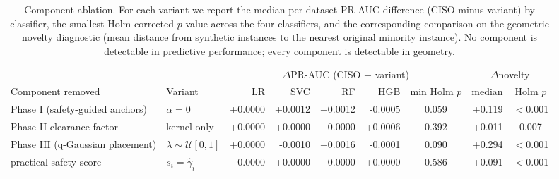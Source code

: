 \begin{table}[t]\centering
\caption{Component ablation. For each variant we report the median per-dataset PR-AUC difference (CISO minus variant) by classifier, the smallest Holm-corrected $p$-value across the four classifiers, and the corresponding comparison on the geometric novelty diagnostic (mean distance from synthetic instances to the nearest original minority instance). No component is detectable in predictive performance; every component is detectable in geometry.}
\label{tab:ablation}\footnotesize\setlength{\tabcolsep}{4pt}
\begin{tabular}{@{}llrrrrc rc@{}}\toprule
& & \multicolumn{5}{c}{$\Delta$PR-AUC (CISO $-$ variant)} & \multicolumn{2}{c}{$\Delta$novelty}\\
\cmidrule(lr){3-7}\cmidrule(lr){8-9}
Component removed & Variant & LR & SVC & RF & HGB & min Holm $p$ & median & Holm $p$\\\midrule
Phase I (safety-guided anchors) & $\alpha=0$ & +0.0000 & +0.0012 & +0.0012 & -0.0005 & 0.059 & +0.119 & $<$0.001 \\
Phase II clearance factor & kernel only & +0.0000 & +0.0000 & +0.0000 & +0.0006 & 0.392 & +0.011 & 0.007 \\
Phase III (q-Gaussian placement) & $\lambda\sim\mathcal{U}[0,1]$ & +0.0000 & -0.0010 & +0.0016 & -0.0001 & 0.090 & +0.294 & $<$0.001 \\
practical safety score & $s_i=\hat\gamma_i$ & -0.0000 & +0.0000 & +0.0000 & +0.0000 & 0.586 & +0.091 & $<$0.001 \\
\bottomrule\end{tabular}\end{table}
